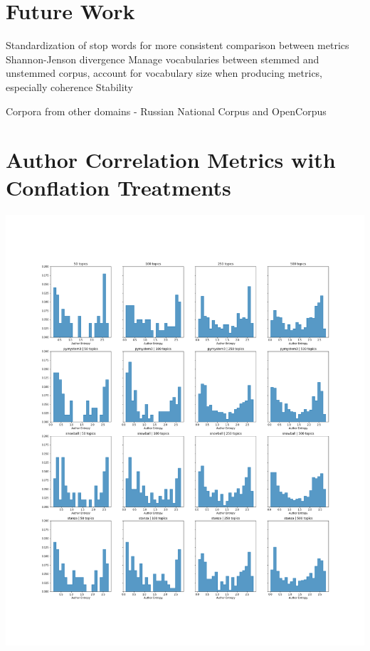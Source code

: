 \documentclass[11pt,a4paper]{article}
\begin{document}
\section{Future Work}
Standardization of stop words for more consistent comparison between metrics
Shannon-Jenson divergence
Manage vocabularies between stemmed and unstemmed corpus, account for vocabulary size when producing metrics, especially coherence
Stability


Corpora from other domains - Russian National Corpus and OpenCorpus




\appendix
\onecolumn
\section{Author Correlation Metrics with Conflation Treatments}
\label{sec:author}
\begin{center}
    \includegraphics[width=\textwidth]{AuthorEntropy.png}
    \label{fig:authorentropy}
\end{center}
\end{document}
